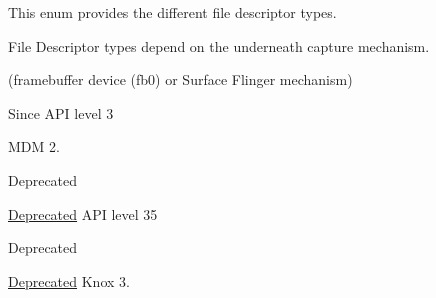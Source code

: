 \-This enum provides the different file descriptor types. 

\-File \-Descriptor types depend on the underneath capture mechanism.

(framebuffer device (fb0) or \-Surface \-Flinger mechanism)

\par


\begin{DoxySince}{\-Since}
\-A\-P\-I level 3

\-M\-D\-M 2.
\end{DoxySince}
\begin{DoxyRefDesc}{\-Deprecated}
\item[\hyperlink{deprecated__deprecated000003}{\-Deprecated}]\-A\-P\-I level 35\end{DoxyRefDesc}


\begin{DoxyRefDesc}{\-Deprecated}
\item[\hyperlink{deprecated__deprecated000004}{\-Deprecated}]\-Knox 3.\end{DoxyRefDesc}
